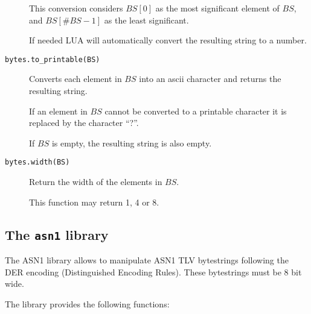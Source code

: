 \documentclass[11pt]{article}
\begin{document}
\begin{description}
{  This conversion considers $BS[0]$ as the most significant element of $BS$, 
  and $BS[\#BS-1]$ as the least significant. 
  
  If needed LUA will automatically convert the resulting string to a number.
}

\item[\texttt{bytes.to\_printable(BS)}]
{
  Converts each element in $BS$ into an ascii character and returns the
  resulting string.

  If an element in $BS$ cannot be converted to a printable character it
  is replaced by the character ``?''. 

  If $BS$ is empty, the resulting string is also empty.
}

\item[\texttt{bytes.width(BS)}]
{
  Return the width of the elements in $BS$.

  This function may return 1, 4 or 8.
}

\end{description}

\subsection{The \texttt{asn1} library}

The ASN1 library allows to manipulate ASN1 TLV bytestrings following the DER 
encoding (Distinguished Encoding Rules).
These bytestrings must be 8 bit wide.

The library provides the following functions:
\end{document}
